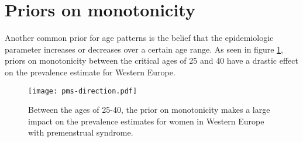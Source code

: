 \section{Priors on monotonicity}
Another common prior for age patterns is the belief that the epidemiologic parameter increases or decreases over a certain age range.  As seen in figure \ref{fig:app-knot_loc}, priors on monotonicity between the critical ages of 25 and 40 have a drastic effect on the prevalence estimate for Western Europe.

    \begin{figure}
        \begin{center}
            \texttt{[image: pms-direction.pdf]}
        \end{center}
        \caption{Between the ages of 25-40, the prior on monotonicity makes a large impact on the prevalence estimates for women in Western Europe with premenstrual syndrome.}
        \label{fig:app-knot_loc}
    \end{figure} 